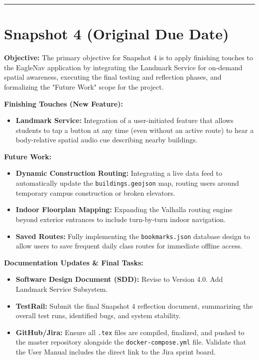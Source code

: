 \documentclass[12pt]{article}
\begin{document}
\vspace{0.5cm}
\hrule
\vspace{0.5cm}

\section*{Snapshot 4 (Original Due Date)}
\textbf{Objective:} 
The primary objective for Snapshot 4 is to apply finishing touches to the EagleNav application by integrating the Landmark Service for on-demand spatial awareness, executing the final testing and reflection phases, and formalizing the "Future Work" scope for the project.

\textbf{Finishing Touches (New Feature):}
\begin{itemize}[noitemsep]
    \item \textbf{Landmark Service:} Integration of a user-initiated feature that allows students to tap a button at any time (even without an active route) to hear a body-relative spatial audio cue describing nearby buildings.
\end{itemize}

\textbf{Future Work:}
\begin{itemize}[noitemsep]
    \item \textbf{Dynamic Construction Routing:} Integrating a live data feed to automatically update the \texttt{buildings.geojson} map, routing users around temporary campus construction or broken elevators.
    \item \textbf{Indoor Floorplan Mapping:} Expanding the Valhalla routing engine beyond exterior entrances to include turn-by-turn indoor navigation.
    \item \textbf{Saved Routes:} Fully implementing the \texttt{bookmarks.json} database design to allow users to save frequent daily class routes for immediate offline access.
\end{itemize}

\textbf{Documentation Updates \& Final Tasks:}
\begin{itemize}[noitemsep]
    \item \textbf{Software Design Document (SDD):} Revise to Version 4.0. Add Landmark Service Subsystem.
    \item \textbf{TestRail:} Submit the final Snapshot 4 reflection document, summarizing the overall test runs, identified bugs, and system stability.
    \item \textbf{GitHub/Jira:} Ensure all \texttt{.tex} files are compiled, finalized, and pushed to the master repository alongside the \texttt{docker-compose.yml} file. Validate that the User Manual includes the direct link to the Jira sprint board.
\end{itemize}
\end{document}
